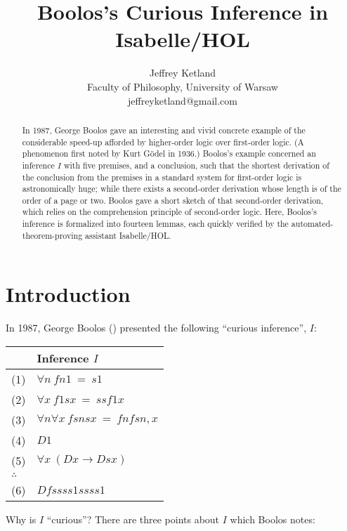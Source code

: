 \documentclass[11pt,a4paper]{article}
\newcommand{\bt}[2]{\small \begin{center}\begin{tabular}{p{#1 cm}p{#2 cm}}}
\def\et{\end{tabular}\end{center}\normalsize}
\theoremstyle{definition}
\begin{document}
\title{Boolos's Curious Inference in Isabelle/HOL}
\author{Jeffrey Ketland\\ 
        Faculty of Philosophy, University of Warsaw\\
	    jeffreyketland@gmail.com
}
\maketitle

\begin{abstract}
In 1987, George Boolos gave an interesting and vivid concrete example of the considerable speed-up afforded by higher-order logic over first-order logic. (A phenomenon first noted by Kurt G\"{o}del in 1936.) Boolos's example concerned an inference $I$ with five premises, and a conclusion, such that the shortest derivation of the conclusion from the premises in a standard system for first-order logic is astronomically huge; while there exists a second-order derivation whose length is of the order of a page or two. Boolos gave a short sketch of that second-order derivation, which relies on the comprehension principle of second-order logic. Here, Boolos's inference is formalized into fourteen lemmas, each quickly verified by the automated-theorem-proving assistant Isabelle/HOL.
\end{abstract}

\tableofcontents



\section{Introduction}\label{Sect: Intro}

In 1987, George Boolos (\cite{boo87}) presented the following ``curious inference'', $I$:

\bt{1}{6} 
& \hspace{10mm}Inference $I$\\
\hline
(1) & $\forall n \ fn 1 \ = \ s 1$\\
(2) & $\forall x \ f1 sx \ = \ s s f1x$\\
(3) & $\forall n \forall x \ fsn sx \ = \ fnfsn, x$\\
(4) & $D1$\\
(5) & $\forall x \ (Dx \to Dsx)$\\
$\therefore$\\
(6) &  $D fssss1 ssss1$
\et

Why is $I$ ``curious''? There are three points about $I$ which Boolos notes:
\end{document}
